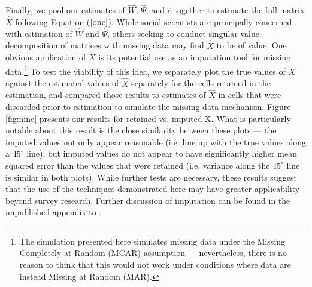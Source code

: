 \documentclass[nojss]{jss}
\begin{document}
Finally, we pool our estimates of $\hat{W}$, $\hat{\Psi}$, and $\hat{c}$ together to
estimate the full matrix $\hat{X}$ following Equation ($\ref{one}$).  While social
scientists are principally concerned with estimation of $\hat{W}$ and $\hat{\Psi}$,
others seeking to conduct singular value decomposition of matrices with missing
data may find $\hat{X}$ to be of value. One obvious application of $\hat{X}$ is
its potential use as an imputation tool for missing data.\footnote{The simulation
presented here simulates missing data under the Missing Completely at Random (MCAR)
assumption --- nevertheless, there is no reason to think that this would not work
under conditions where data are instead Missing at Random (MAR).} To test the viability
of this idea, we separately plot the true values of $X$ against the estimated values
of $\hat{X}$ separately for the cells retained in the estimation, and compared
those results to estimates of $\hat{X}$ in cells that were discarded prior to estimation
to simulate the missing data mechanism. Figure \ref{fig:nine} presents our results for retained vs.
imputed X. What is particularly notable about this result is the close similarity
between these plots --- the imputed values not only appear reasonable (i.e. line up
with the true values along a $45^{\circ}$ line), but imputed values do not appear to have
significantly higher mean squared error than the values that were retained (i.e. variance
along the $45^{\circ}$ line is similar in both plots). While further tests are necessary,
these results suggest that the use of the techniques demonstrated here may have greater
applicability beyond survey research.  Further discussion of imputation can be found in the
unpublished appendix to \citet{poole1998recovering}.
\end{document}
